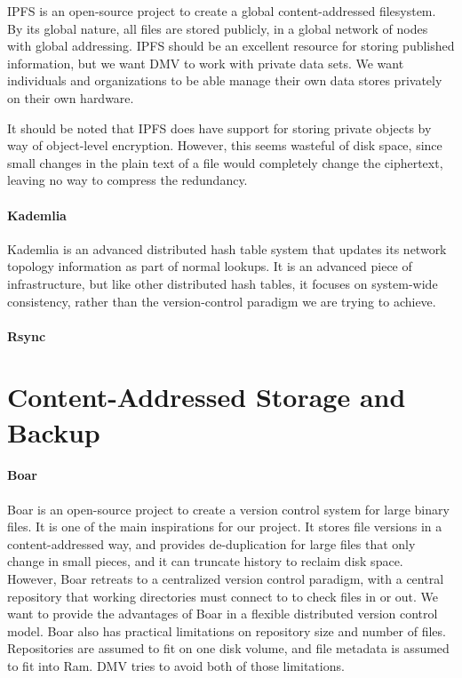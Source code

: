IPFS \cite{ipfs_github_main} is an open-source project to create a global
content-addressed filesystem. By its global nature, all files are stored
publicly, in a global network of nodes with global addressing. IPFS should be an
excellent resource for storing published information, but we want \gls{DMV} to
work with private data sets. We want individuals and organizations to be able
manage their own data stores privately on their own hardware.

It should be noted that IPFS does have support for storing private objects by
way of object-level encryption. However, this seems wasteful of disk space,
since small changes in the plain text of a file would completely change the
ciphertext, leaving no way to compress the redundancy.


\paragraph{Kademlia}

Kademlia \cite{Maymounkov2002} is an advanced distributed hash table system that
updates its network topology information as part of normal lookups. It is an
advanced piece of infrastructure, but like other distributed hash tables, it
focuses on system-wide consistency, rather than the version-control paradigm we
are trying to achieve.



\paragraph{Rsync}
\label{related-rsync}



\section{Content-Addressed Storage and Backup}

\paragraph{Boar}

Boar \cite{boar_homepage} is an open-source project to create a version control
system for large binary files. It is one of the main inspirations for our
project. It stores file versions in a content-addressed way, and provides
de-duplication for large files that only change in small pieces, and it can
truncate history to reclaim disk space. However, Boar retreats to a centralized
version control paradigm, with a central repository that working directories
must connect to to check files in or out. We want to provide the advantages of
Boar in a flexible distributed version control model. Boar also has practical
limitations on repository size and number of files. Repositories are assumed to
fit on one disk volume, and file metadata is assumed to fit into Ram. \gls{DMV}
tries to avoid both of those limitations.


